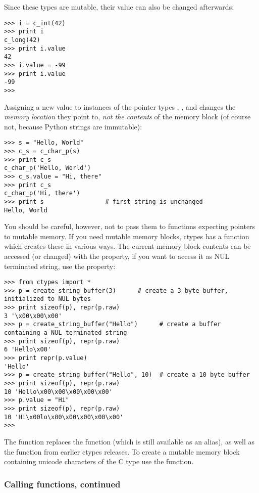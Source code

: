 Since these types are mutable, their value can also be changed
afterwards:
\begin{verbatim}
>>> i = c_int(42)
>>> print i
c_long(42)
>>> print i.value
42
>>> i.value = -99
>>> print i.value
-99
>>>
\end{verbatim}

Assigning a new value to instances of the pointer types ,
, and  changes the \emph{memory location} they
point to, \emph{not the contents} of the memory block (of course not,
because Python strings are immutable):
\begin{verbatim}
>>> s = "Hello, World"
>>> c_s = c_char_p(s)
>>> print c_s
c_char_p('Hello, World')
>>> c_s.value = "Hi, there"
>>> print c_s
c_char_p('Hi, there')
>>> print s                 # first string is unchanged
Hello, World
\end{verbatim}

You should be careful, however, not to pass them to functions
expecting pointers to mutable memory. If you need mutable memory
blocks, ctypes has a  function which creates
these in various ways.  The current memory block contents can be
accessed (or changed) with the  property, if you want to access
it as NUL terminated string, use the  property:
\begin{verbatim}
>>> from ctypes import *
>>> p = create_string_buffer(3)      # create a 3 byte buffer, initialized to NUL bytes
>>> print sizeof(p), repr(p.raw)
3 '\x00\x00\x00'
>>> p = create_string_buffer("Hello")      # create a buffer containing a NUL terminated string
>>> print sizeof(p), repr(p.raw)
6 'Hello\x00'
>>> print repr(p.value)
'Hello'
>>> p = create_string_buffer("Hello", 10)  # create a 10 byte buffer
>>> print sizeof(p), repr(p.raw)
10 'Hello\x00\x00\x00\x00\x00'
>>> p.value = "Hi"
>>> print sizeof(p), repr(p.raw)
10 'Hi\x00lo\x00\x00\x00\x00\x00'
>>>
\end{verbatim}

The  function replaces the 
function (which is still available as an alias), as well as the
 function from earlier ctypes releases.  To create a
mutable memory block containing unicode characters of the C type
 use the  function.


\subsubsection{Calling functions, continued\label{ctypes-calling-functions-continued}}


